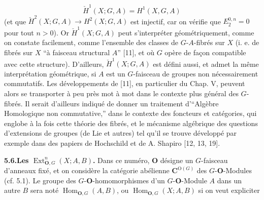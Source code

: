 \[
\check H^1(X;G,A)=H^1(X,G,A)
\]
 (et que $\check H^2(X;G,A)\to H^2(X;G,A)$ est injectif, car on
vérifie que $E_2^{0,n}=0$ pour tout $n>0$).
Or $\check H^1(X;G,A)$ peut s'interpréter géométriquement, comme on constate
facilement, comme l'ensemble des classes de $G$-$A$-fibrés sur $X$ (i. e. de
fibrés sur $X$ ``à faisceau structural $A$'' [11], et où $G$ opère de façon
compatible avec cette structure). D'ailleurs, $\check H^1(X;G,A)$ est défini
aussi, et admet la même interprétation géométrique, si $A$ est un $G$-faisceau
de groupes non nécessairement commutatifs. Les développements de [11], en
particulier du Chap. V, peuvent alors se transporter à peu près mot à mot dans
le contexte plus général des $G$-fibrés. Il serait d'ailleurs indiqué de donner
un traitement d'``Algèbre Homologique non commutative,'' dans le contexte des
foncteurs et catégories, qui englobe à la fois cette théorie des fibrés, et le
mécanisme algébrique des questions d'extensions de groupes (de Lie et autres)
tel qu'il se trouve développé par exemple dans des papiers de Hochschild et de
A. Shapiro [12, 13, 19].

\textbf{5.6.\quad Les $\operatorname{Ext}^n_{{\mathbf O},G}(X;A,B)$.}
Dans ce numéro, ${\mathbf O}$ désigne un $G$-faisceau d'anneaux fixé, et on considère la
catégorie abélienne ${\mathbf C}^{\mathrm O(G)}$ des $G$-${\mathbf O}$-Modules (cf. 5.1).
Le groupe des $G$-${\mathbf O}$-homomorphismes d'un $G$-${\mathbf O}$-Module $A$ dans un autre
$B$ sera noté $\operatorname{Hom}_{{\mathbf O},G}(A,B)$, ou
$\operatorname{Hom}_{{\mathbf O},G}(X;A,B)$ si on veut expliciter


